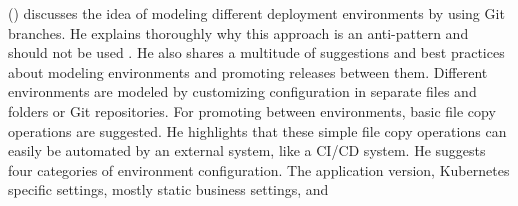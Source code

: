 



\citeauthor{codefreshStopUsingBranchesGitOpsEnvironments} (\citeyear{codefreshStopUsingBranchesGitOpsEnvironments})
discusses
the idea of
modeling different deployment environments by using Git branches.
He
explains thoroughly why this approach is an anti-pattern and should not be used
\autocite{codefreshStopUsingBranchesGitOpsEnvironments}.
He
also shares
a multitude of suggestions and best practices
about modeling environments and promoting releases between them.
Different environments are modeled by customizing configuration in separate files and folders or Git repositories.
For promoting between environments, basic file copy operations are suggested.
He highlights that these simple file copy operations can easily be automated by an external system,
like a CI/CD system.
He
suggests four categories of environment configuration.
The application version,
Kubernetes specific settings,
mostly static business settings,
and 
